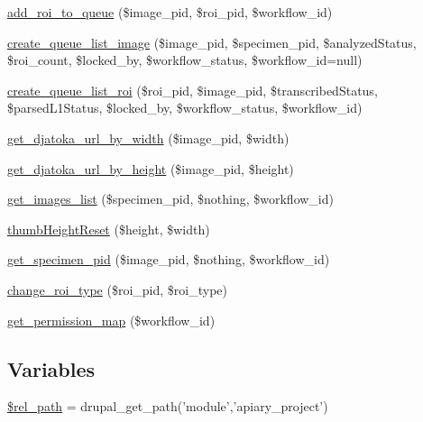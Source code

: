 \begin{DoxyCompactItemize}
\item 
\hyperlink{analyze_8functions_8php_a42cc21dd56bf989bad557ca72edef3fc}{add\_\-roi\_\-to\_\-queue} (\$image\_\-pid, \$roi\_\-pid, \$workflow\_\-id)
\item 
\hyperlink{analyze_8functions_8php_a734deca8701dbc178f8deab344dc6919}{create\_\-queue\_\-list\_\-image} (\$image\_\-pid, \$specimen\_\-pid, \$analyzedStatus, \$roi\_\-count, \$locked\_\-by, \$workflow\_\-status, \$workflow\_\-id=null)
\item 
\hyperlink{analyze_8functions_8php_a3f96187322c4cb55b00f35ebda175b8b}{create\_\-queue\_\-list\_\-roi} (\$roi\_\-pid, \$image\_\-pid, \$transcribedStatus, \$parsedL1Status, \$locked\_\-by, \$workflow\_\-status, \$workflow\_\-id)
\item 
\hyperlink{analyze_8functions_8php_a956d8e9f9a8b25192ddfd4c594468920}{get\_\-djatoka\_\-url\_\-by\_\-width} (\$image\_\-pid, \$width)
\item 
\hyperlink{analyze_8functions_8php_a5b8736da01191c26d860005d1999325c}{get\_\-djatoka\_\-url\_\-by\_\-height} (\$image\_\-pid, \$height)
\item 
\hyperlink{analyze_8functions_8php_ad4b0e661fe8a8e5cedb6d3442f27fc6d}{get\_\-images\_\-list} (\$specimen\_\-pid, \$nothing, \$workflow\_\-id)
\item 
\hyperlink{analyze_8functions_8php_ad640cacecc876546bdb4ed01084708aa}{thumbHeightReset} (\$height, \$width)
\item 
\hyperlink{analyze_8functions_8php_a84f8a9fd1fdd21b005dc0a4684b6f5fe}{get\_\-specimen\_\-pid} (\$image\_\-pid, \$nothing, \$workflow\_\-id)
\item 
\hyperlink{analyze_8functions_8php_acd2326183b88a4b79d4f3812207e658a}{change\_\-roi\_\-type} (\$roi\_\-pid, \$roi\_\-type)
\item 
\hyperlink{analyze_8functions_8php_ad3ad3c24ee1cf11791c0370dba068f3d}{get\_\-permission\_\-map} (\$workflow\_\-id)
\end{DoxyCompactItemize}
\subsection*{Variables}
\begin{DoxyCompactItemize}
\item 
\hyperlink{analyze_8functions_8php_aea941c07a4c4543da9db61e709571719}{\$rel\_\-path} = drupal\_\-get\_\-path('module','apiary\_\-project')
\end{DoxyCompactItemize}


